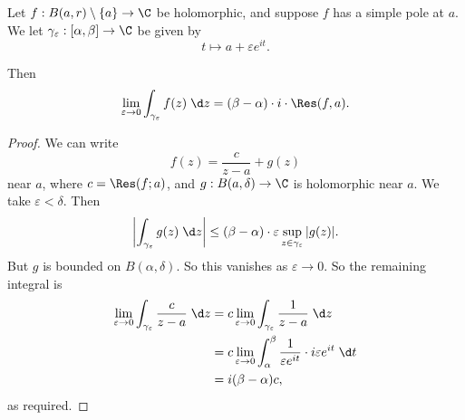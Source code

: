 \documentclass[a4paper]{article}
\begin{document}
\begin{lemma}
  Let $f: B(a, r) \setminus \{a\} \to \C$ be holomorphic, and suppose $f$ has a simple pole at $a$. We let $\gamma_\varepsilon: [\alpha, \beta] \to \C$ be given by
  \[
    t\mapsto a + \varepsilon e^{it}.
  \]
  \begin{center}
  \end{center}
  Then
  \[
    \lim_{\varepsilon \to 0} \int_{\gamma_\varepsilon} f(z)\;\d z = (\beta - \alpha) \cdot i \cdot \Res(f, a).
  \]
\end{lemma}

\begin{proof}
  We can write
  \[
    f(z) = \frac{c}{z - a} + g(z)
  \]
  near $a$, where $c = \Res(f; a)$, and $g: B(a, \delta) \to \C$ is holomorphic near $a$. We take $\varepsilon < \delta$. Then
  \[
    \left|\int_{\gamma_\varepsilon} g(z)\;\d z\right| \leq (\beta - \alpha) \cdot \varepsilon \sup_{z \in \gamma_\varepsilon} |g(z)|.
  \]
  But $g$ is bounded on $B(\alpha, \delta)$. So this vanishes as $\varepsilon \to 0$. So the remaining integral is
  \begin{align*}
    \lim_{\varepsilon \to 0} \int_{\gamma_\varepsilon} \frac{c}{z - a}\;\d z &= c \lim_{\varepsilon \to 0} \int_{\gamma_\varepsilon} \frac{1}{z - a} \;\d z\\
    &= c \lim_{\varepsilon \to 0} \int_\alpha^\beta \frac{1}{\varepsilon e^{it}} \cdot i\varepsilon e^{it}\;\d t\\
    &= i(\beta - \alpha) c,
  \end{align*}
  as required.
\end{proof}
\end{document}
